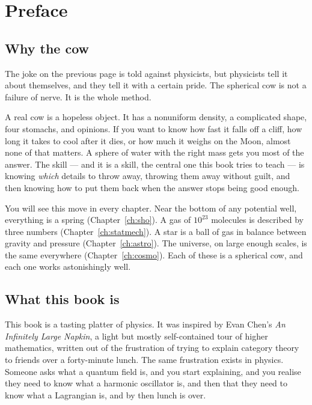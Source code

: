 \chapter{Preface}

\section*{Why the cow}

The joke on the previous page is told against physicists, but physicists tell it about themselves, and they tell it with a certain pride. The spherical cow is not a failure of nerve. It is the whole method.

A real cow is a hopeless object. It has a nonuniform density, a complicated shape, four stomachs, and opinions. If you want to know how fast it falls off a cliff, how long it takes to cool after it dies, or how much it weighs on the Moon, almost none of that matters. A sphere of water with the right mass gets you most of the answer. The skill --- and it is a skill, the central one this book tries to teach --- is knowing \emph{which} details to throw away, throwing them away without guilt, and then knowing how to put them back when the answer stops being good enough.

You will see this move in every chapter. Near the bottom of any potential well, everything is a spring (Chapter~\ref{ch:sho}). A gas of $10^{23}$ molecules is described by three numbers (Chapter~\ref{ch:statmech}). A star is a ball of gas in balance between gravity and pressure (Chapter~\ref{ch:astro}). The universe, on large enough scales, is the same everywhere (Chapter~\ref{ch:cosmo}). Each of these is a spherical cow, and each one works astonishingly well.

\section*{What this book is}

This book is a tasting platter of physics. It was inspired by Evan Chen's \emph{An Infinitely Large Napkin}, a light but mostly self-contained tour of higher mathematics, written out of the frustration of trying to explain category theory to friends over a forty-minute lunch. The same frustration exists in physics. Someone asks what a quantum field is, and you start explaining, and you realise they need to know what a harmonic oscillator is, and then that they need to know what a Lagrangian is, and by then lunch is over.

